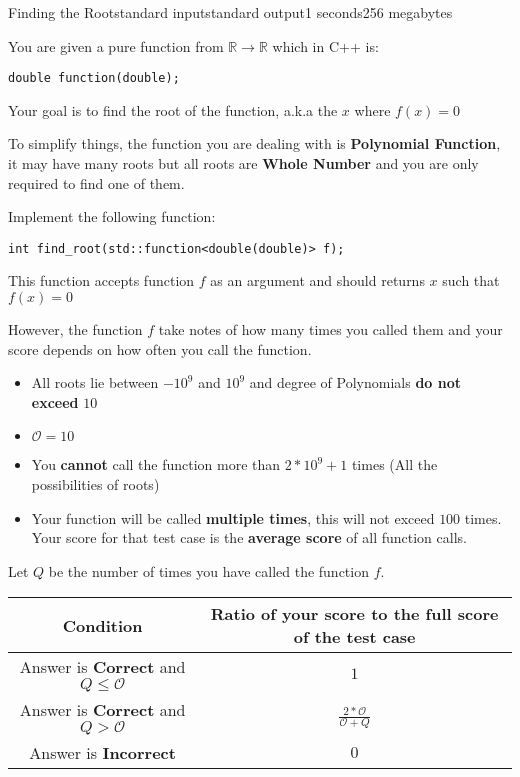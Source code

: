 \documentclass[11pt,a4paper]{article}
\begin{document}
\begin{problem}{Finding the Root}{standard input}{standard output}{1 seconds}{256 megabytes}

You are given a pure function from $\mathbb{R}\rightarrow\mathbb{R}$
which in C++ is:

\begin{verbatim}
double function(double);
\end{verbatim}

Your goal is to find the root of the function, a.k.a the $x$ where $f(x) = 0$

To simplify things, the function you are dealing with is \textbf{Polynomial Function},
it may have many roots but all roots are \textbf{Whole Number} and you are only
required to find one of them.

Implement the following function:

\begin{verbatim}
int find_root(std::function<double(double)> f);
\end{verbatim}

This function accepts function $f$ as an argument and should returns $x$
such that $f(x) = 0$

However, the function $f$ take notes of how many times you called them and
your score depends on how often you call the function.

\Constraints

\begin{itemize}
\item All roots lie between $-10^9$ and $10^9$ and degree of Polynomials \textbf{do not exceed} $10$
\item $\mathcal{O} = 10$
\item You \textbf{cannot} call the function more than $2*10^9+1$ times (All the possibilities of roots)
\item Your function will be called \textbf{multiple times}, this will not exceed $100$ times.
Your score for that test case is the \textbf{average score} of all function calls.
\end{itemize}

\Scoring

\begin{center}

Let $Q$ be the number of times you have called the function $f$.

\begin{tabular}{ | c | c | }
\hline
\textbf{Condition} & \textbf{Ratio of your score to the full score of the test case} \\
\hline
Answer is \textbf{Correct} and $Q \le \mathcal{O}$ & $1$ \\
\hline
Answer is \textbf{Correct} and $Q > \mathcal{O}$ & $\frac{2*\mathcal{O}}{\mathcal{O}+Q}$ \\
\hline
Answer is \textbf{Incorrect} & $0$ \\
\hline
\end{tabular}
\end{center}


\end{problem}
\end{document}
